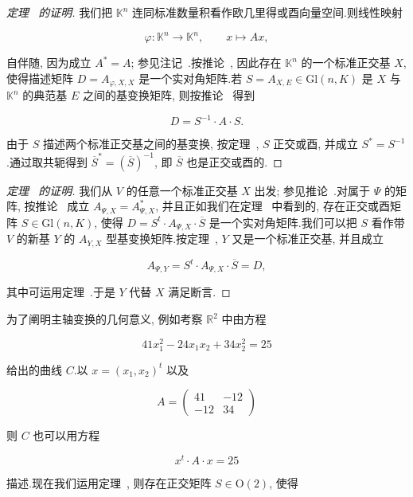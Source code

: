 \begin{proof}[定理~ 的证明]
我们把 $\mathbb{K}^n$ 连同标准数量积看作欧几里得或酉向量空间.则线性映射

\[
\varphi \colon \mathbb{K}^n \longrightarrow \mathbb{K}^n, \qquad x \longmapsto A x,
\]

自伴随, 因为成立 $A^* = A$; 参见注记~.按推论~, 因此存在 $\mathbb{K}^n$ 的一个标准正交基 $X$, 使得描述矩阵 $D = A_{\varphi, X, X}$ 是一个实对角矩阵.若 $S = A_{X, E} \in \mathrm{Gl}(n, K)$ 是 $X$ 与 $\mathbb{K}^n$ 的典范基 $E$ 之间的基变换矩阵, 则按推论~ 得到

\[
D = S^{-1} \cdot A \cdot S\text{.}
\]

由于 $S$ 描述两个标准正交基之间的基变换, 按定理~, $S$ 正交或酉, 并成立 $S^* = S^{-1}$.通过取共轭得到 $\overline{S}^* = (\overline{S})^{-1}$, 即 $\overline{S}$ 也是正交或酉的.
\end{proof}

\begin{proof}[定理~ 的证明]
我们从 $V$ 的任意一个标准正交基 $X$ 出发; 参见推论~.对属于 $\Psi$ 的矩阵, 按推论~ 成立 $A_{\varPsi, X} = A_{\varPsi, X}^*$, 并且正如我们在定理~ 中看到的, 存在正交或酉矩阵 $S \in \mathrm{Gl}(n, K)$, 使得 $D = S^t \cdot A_{\varPsi, X} \cdot \overline{S}$ 是一个实对角矩阵.我们可以把 $S$ 看作带 $V$ 的新基 $Y$ 的 $A_{Y, X}$ 型基变换矩阵.按定理~, $Y$ 又是一个标准正交基, 并且成立

\[
A_{\varPsi, Y} = S^t \cdot A_{\varPsi, X} \cdot \overline{S} = D,
\]

其中可运用定理~.于是 $Y$ 代替 $X$ 满足断言.
\end{proof}

为了阐明主轴变换的几何意义, 例如考察 $\mathbb{R}^2$ 中由方程

\[
41 x_1^2 - 24 x_1 x_2 + 34 x_2^2 = 25
\]

给出的曲线 $C$.以 $x = (x_1, x_2)^t$ 以及

\[
A = \begin{pmatrix} 41 & -12 \\ -12 & 34 \end{pmatrix}
\]

则 $C$ 也可以用方程

\[
x^t \cdot A \cdot x = 25
\]

描述.现在我们运用定理~, 则存在正交矩阵 $S \in \mathrm{O}(2)$, 使得

